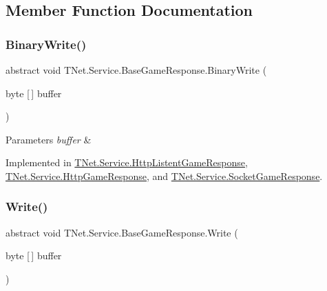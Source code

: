 \subsection{Member Function Documentation}
\mbox{\label{class_t_net_1_1_service_1_1_base_game_response_a1e037de4af1a1fee323cc7efbe9cbc3e}} 
\subsubsection{\texorpdfstring{Binary\+Write()}{BinaryWrite()}}
{\footnotesize\ttfamily abstract void T\+Net.\+Service.\+Base\+Game\+Response.\+Binary\+Write (\begin{DoxyParamCaption}\item[{byte \mbox{[}$\,$\mbox{]}}]{buffer }\end{DoxyParamCaption})\hspace{0.3cm}{\ttfamily [pure virtual]}}






\begin{DoxyParams}{Parameters}
{\em buffer} & \\
\hline
\end{DoxyParams}


Implemented in \mbox{\hyperlink{class_t_net_1_1_service_1_1_http_listent_game_response_ac7b76407d3675d404c1a9079c168e4cb}{T\+Net.\+Service.\+Http\+Listent\+Game\+Response}}, \mbox{\hyperlink{class_t_net_1_1_service_1_1_http_game_response_a7fe3b5c8af0ef5f618bbc4040d3a4b3c}{T\+Net.\+Service.\+Http\+Game\+Response}}, and \mbox{\hyperlink{class_t_net_1_1_service_1_1_socket_game_response_a775270418861d86bc30023938da2c2f9}{T\+Net.\+Service.\+Socket\+Game\+Response}}.

\mbox{\label{class_t_net_1_1_service_1_1_base_game_response_a2ede5b36253063e68dbe5553a95bf1e2}} 
\subsubsection{\texorpdfstring{Write()}{Write()}}
{\footnotesize\ttfamily abstract void T\+Net.\+Service.\+Base\+Game\+Response.\+Write (\begin{DoxyParamCaption}\item[{byte \mbox{[}$\,$\mbox{]}}]{buffer }\end{DoxyParamCaption})\hspace{0.3cm}{\ttfamily [pure virtual]}}






